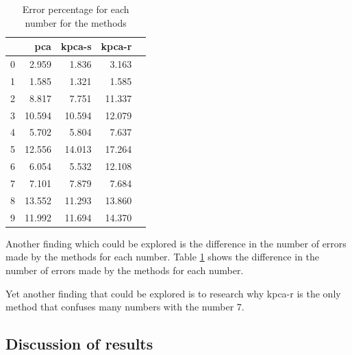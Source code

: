 \begin{table}[htb!]
    \centering
    \begin{tabular}{lrrrr}
        \toprule
          & pca    & kpca-s & kpca-r \\
        \midrule
        0 & 2.959  & 1.836  & 3.163  \\
        1 & 1.585  & 1.321  & 1.585  \\
        2 & 8.817  & 7.751  & 11.337 \\
        3 & 10.594 & 10.594 & 12.079 \\
        4 & 5.702  & 5.804  & 7.637  \\
        5 & 12.556 & 14.013 & 17.264 \\
        6 & 6.054  & 5.532  & 12.108 \\
        7 & 7.101  & 7.879  & 7.684  \\
        8 & 13.552 & 11.293 & 13.860 \\
        9 & 11.992 & 11.694 & 14.370 \\
        \bottomrule
    \end{tabular}
    \caption{Error percentage for each number for the methods}
    \label{tab:error-percentage-pca-kpca-s-kpca-r}
\end{table}

Another finding which could be explored is the difference in the number of errors made by the methods for each number. Table \ref{tab:error-percentage-pca-kpca-s-kpca-r} shows the difference in the number of errors made by the methods for each number.

Yet another finding that could be explored is to research why \gls{kpca-r} is the only method that confuses many numbers with the number 7.
\subsection{Discussion of results}

